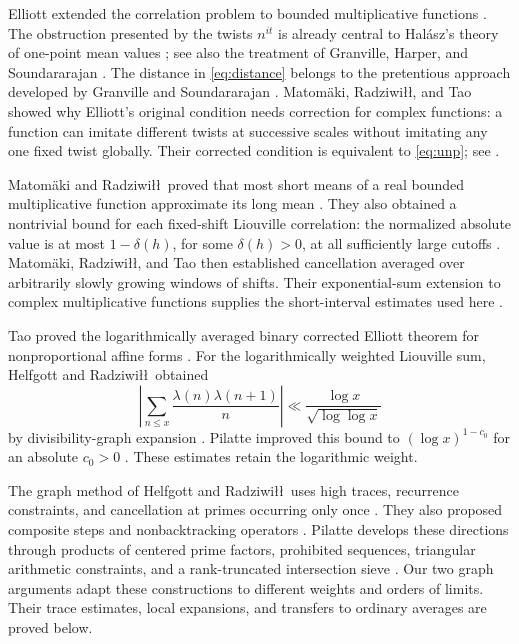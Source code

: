 Elliott extended the correlation problem to bounded multiplicative
functions \cite{Elliott92}. The obstruction presented by the twists
\(n^{it}\) is already central to Hal\'asz's theory of one-point mean
values \cite{Halasz71}; see also the treatment of Granville, Harper,
and Soundararajan \cite{GHS19}. The distance in \eqref{eq:distance}
belongs to the pretentious approach developed by Granville and
Soundararajan \cite[Section~3]{GS07}. Matom\"aki, Radziwi\l\l, and Tao
showed why Elliott's original condition needs correction for complex
functions: a function can imitate different twists at successive
scales without imitating any one fixed twist globally. Their
corrected condition is equivalent to \eqref{eq:unp}; see
\cite[Section~1.1 and Appendix~B]{MRT15}.

Matom\"aki and Radziwi\l\l\ proved that most short means of a real
bounded multiplicative function approximate its long mean
\cite[Theorem~1]{MR16}. They also obtained a nontrivial bound for each
fixed-shift Liouville correlation: the normalized absolute value is
at most \(1-\delta(h)\), for some \(\delta(h)>0\), at all sufficiently
large cutoffs \cite[Corollary~2]{MR16}. Matom\"aki, Radziwi\l\l, and
Tao then established cancellation averaged over arbitrarily slowly
growing windows of shifts. Their exponential-sum extension to
complex multiplicative functions supplies the short-interval
estimates used here \cite[Theorems~1.1, 1.3, and~1.7]{MRT15}.

Tao proved the logarithmically averaged binary corrected Elliott
theorem for nonproportional affine forms
\cite[Theorem~1.3 and Corollary~1.5]{Tao16}.
For the logarithmically weighted Liouville sum, Helfgott and
Radziwi\l\l\ obtained
\[
 \left|\sum_{n\le x}\frac{\lambda(n)\lambda(n+1)}n\right|
 \ll \frac{\log x}{\sqrt{\log\log x}}
\]
by divisibility-graph expansion \cite[Corollary~1.5]{HR21}.
Pilatte improved this bound to \((\log x)^{1-c_0}\) for an absolute
\(c_0>0\) \cite[Theorem~1.1]{Pilatte26}.
These estimates retain the logarithmic weight.

The graph method of Helfgott and Radziwi\l\l\ uses high traces,
recurrence constraints, and cancellation at primes occurring only
once \cite[Sections~2--7]{HR21}. They also proposed composite steps
and nonbacktracking operators \cite[Sections~9.1--9.2]{HR21}.
Pilatte develops these directions through products of centered prime
factors, prohibited sequences, triangular arithmetic constraints,
and a rank-truncated intersection sieve
\cite[Sections~2--13 and Appendix~B]{Pilatte26}.
Our two graph arguments adapt these constructions to different
weights and orders of limits. Their trace estimates, local
expansions, and transfers to ordinary averages are proved below.


